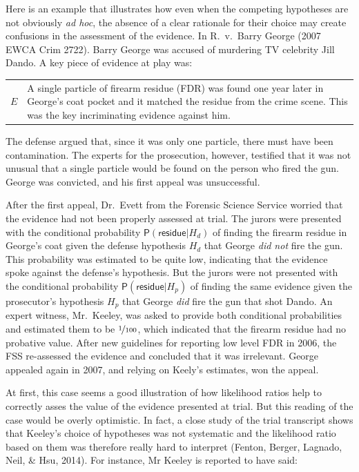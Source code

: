 \documentclass[
  10pt,
  dvipsnames,enabledeprecatedfontcommands]{scrartcl}
\newcommand{\pr}[1]{\mathsf{P}(#1)}
\begin{document}
Here is an example that illustrates how even when the competing
hypotheses are not obviously \textit{ad hoc}, the absence of a clear
rationale for their choice may create confusions in the assessment of
the evidence. In R.~v.~Barry George (2007 EWCA Crim 2722). Barry George
was accused of murdering TV celebrity Jill Dando. A key piece of
evidence at play was: \vspace{2mm}

\begin{center}
\begin{tabular}{lp{12cm}} 
    $E$ &  
    A single particle of firearm  residue (FDR) 
     was found one year later in George's coat pocket and it matched the residue from the crime scene.
     This was the key incriminating evidence against him. 
\end{tabular}
\end{center}
\vspace{2mm}

\noindent  The defense argued that, since it was only one particle,
there must have been contamination. The experts for the prosecution,
however, testified that it was not unusual that a single particle would
be found on the person who fired the gun. George was convicted, and his
first appeal was unsuccessful.

After the first appeal, Dr.~Evett from the Forensic Science Service
worried that the evidence had not been properly assessed at trial. The
jurors were presented with the conditional probability
\(\pr{\textsf{residue}\vert H_d}\) of finding the firearm residue in
George's coat given the defense hypothesis \(H_d\) that George
\textit{did not} fire the gun. This probability was estimated to be
quite low, indicating that the evidence spoke against the defense's
hypothesis. But the jurors were not presented with the conditional
probability \(\pr{\textsf{residue}\vert H_p}\) of finding the same
evidence given the prosecutor's hypothesis \(H_p\) that George
\textit{did} fire the gun that shot Dando. An expert witness,
Mr.~Keeley, was asked to provide both conditional probabilities and
estimated them to be \(\nicefrac{1}{100}\), which indicated that the
firearm residue had no probative value. After new guidelines for
reporting low level FDR in 2006, the FSS re-assessed the evidence and
concluded that it was irrelevant. George appealed again in 2007, and
relying on Keely's estimates, won the appeal.

At first, this case seems a good illustration of how likelihood ratios
help to correctly asses the value of the evidence presented at trial.
But this reading of the case would be overly optimistic. In fact, a
close study of the trial transcript shows that Keeley's choice of
hypotheses was not systematic and the likelihood ratio based on them was
therefore really hard to interpret (Fenton, Berger, Lagnado, Neil, \&
Hsu, 2014). For instance, Mr Keeley is reported to have said:
\end{document}
